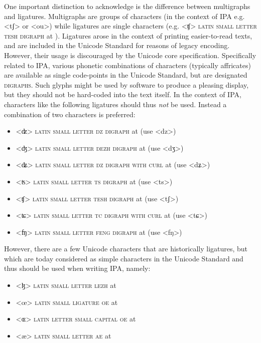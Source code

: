 
One important distinction to acknowledge is the difference between multigraphs
and ligatures. Multigraphs are groups of characters (in the context of IPA e.g.
<tʃ> or <ou>) while ligatures are single characters (e.g. <ʧ> \textsc{latin
small letter tesh digraph} at ). Ligatures arose in the context of
printing easier-to-read texts, and are included in the Unicode Standard for
reasons of legacy encoding. However, their usage is discouraged by the Unicode
core specification. Specifically related to IPA, various phonetic combinations
of characters (typically affricates) are available as single code-points in the
Unicode Standard, but are designated \textsc{digraphs}. Such glyphs might be used by
software to produce a pleasing display, but they should not be hard-coded into
the text itself. In the context of IPA, characters like the following ligatures
should thus \emph{not} be used. Instead a combination of two characters is
preferred:
      
\begin{itemize} 
	\item[] <ʣ> \textsc{latin small letter dz digraph} at  
	  (use <dz>) 
    \item[] <ʤ> \textsc{latin small letter dezh digraph} at 
      (use <dʒ>)
    \item[] <ʥ> \textsc{latin small letter dz digraph with curl} at 
      (use <dʑ>)
    \item[] <ʦ> \textsc{latin small letter ts digraph} at  
      (use <ts>)
	\item[] <ʧ> \textsc{latin small letter tesh digraph} at  
	  (use <tʃ>) 
    \item[] <ʨ> \textsc{latin small letter tc digraph with curl} at 
      (use <tɕ>)
   	\item[] <ʩ> \textsc{latin small letter feng digraph} at 
	  (use <fŋ>) 
\end{itemize}

However, there are a few Unicode characters that are historically ligatures, but
which are today considered as simple characters in the Unicode Standard and thus
should be used when writing IPA, namely:

\begin{itemize}
	\item[] <ɮ> \textsc{latin small letter lezh} at  
	\item[] <œ> \textsc{latin small ligature oe} at  
	\item[] <ɶ> \textsc{latin letter small capital oe} at  
	\item[] <æ> \textsc{latin small letter ae} at  
\end{itemize}

